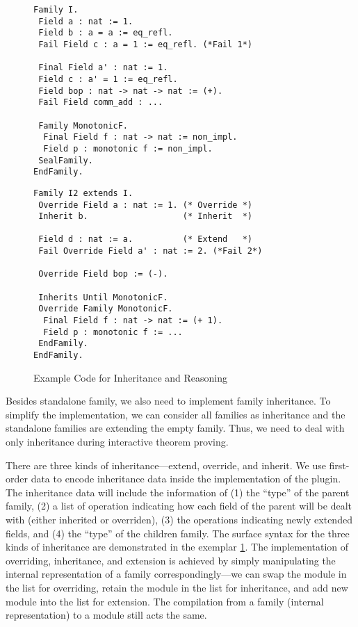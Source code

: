 \begin{figure}[!htb]
  \begin{minipage}[t]{0.45\linewidth}
\begin{verbatim}
Family I.
 Field a : nat := 1.
 Field b : a = a := eq_refl.
 Fail Field c : a = 1 := eq_refl. (*Fail 1*)

 Final Field a' : nat := 1.
 Field c : a' = 1 := eq_refl.
 Field bop : nat -> nat -> nat := (+).
 Fail Field comm_add : ...

 Family MonotonicF.
  Final Field f : nat -> nat := non_impl.
  Field p : monotonic f := non_impl.
 SealFamily. 
EndFamily.
\end{verbatim}
  \end{minipage}
\begin{minipage}[t]{0.45\linewidth}
\begin{verbatim}
Family I2 extends I.
 Override Field a : nat := 1. (* Override *)
 Inherit b.                   (* Inherit  *)

 Field d : nat := a.          (* Extend   *)
 Fail Override Field a' : nat := 2. (*Fail 2*)

 Override Field bop := (-).

 Inherits Until MonotonicF.
 Override Family MonotonicF.
  Final Field f : nat -> nat := (+ 1).
  Field p : monotonic f := ...
 EndFamily. 
EndFamily.
\end{verbatim}
  \end{minipage}
  \caption{Example Code for Inheritance and Reasoning}\label{fig:plugin-example3}
\end{figure}

Besides standalone family, we also need to implement family inheritance.
To simplify the implementation, we can consider all families as
inheritance and the standalone families are extending the empty family.
Thus, we need to deal with only inheritance during interactive theorem proving.


There are three kinds of inheritance---extend, override, and inherit. We
use first-order data to encode inheritance data inside the
implementation of the plugin. The inheritance data will include the
information of (1) the ``type'' of the parent family, (2) a list of
operation indicating how each field of the parent will be dealt with
(either inherited or overriden), (3) the operations indicating newly
extended fields, and (4) the ``type'' of the children family.
The surface syntax for the three kinds of inheritance
are demonstrated in the exemplar \cref*{fig:plugin-example3}. The
implementation of overriding, inheritance, and extension is achieved by
simply manipulating the internal representation of a family
correspondingly---we can swap the module in the list for overriding,
retain the module in the list for inheritance, and add new module into
the list for extension. The compilation from a family (internal
representation) to a module still acts the same.

